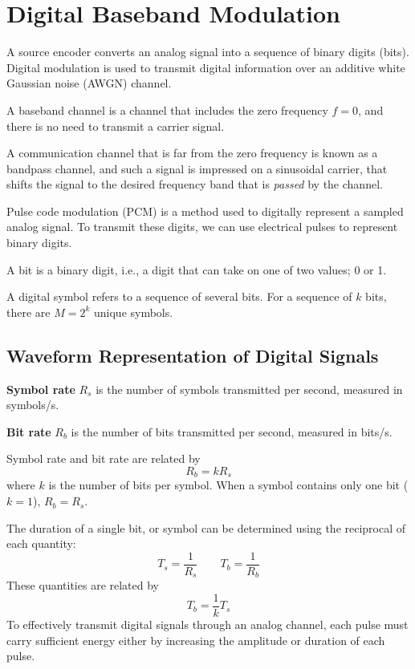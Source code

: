 \documentclass{article}
\begin{document}
\section{Digital Baseband Modulation}
A source encoder converts an analog signal into a sequence of binary
digits (bits). Digital modulation is used to transmit digital
information over an additive white Gaussian noise (AWGN) channel.
\begin{definition}
    A baseband channel is a channel that includes the zero frequency
    \(f = 0\), and there is no need to transmit a carrier signal.
\end{definition}
\begin{definition}
    A communication channel that is far from the zero frequency is
    known as a bandpass channel, and such a signal is impressed on a
    sinusoidal carrier, that shifts the signal to the desired frequency
    band that is \textit{passed} by the channel.
\end{definition}
Pulse code modulation (PCM) is a method used to digitally represent a
sampled analog signal. To transmit these digits, we can use electrical
pulses to represent binary digits.
\begin{definition}[Bit]
    A bit is a binary digit, i.e., a digit that can take on one of two
    values; 0 or 1.
\end{definition}
\begin{definition}
    A digital symbol refers to a sequence of several bits.
    For a sequence of \(k\) bits, there are \(M = 2^k\) unique symbols.
\end{definition}
\subsection{Waveform Representation of Digital Signals}
\textbf{Symbol rate} \(R_s\) is the number of symbols transmitted
per second, measured in \unit{symbols/s}.

\textbf{Bit rate} \(R_b\) is the number of bits transmitted
per second, measured in \unit{bits/s}.

Symbol rate and bit rate are related by
\begin{equation*}
    R_b = k R_s
\end{equation*}
where \(k\) is the number of bits per symbol. When a symbol contains
only one bit (\(k = 1\)), \(R_b = R_s\).

The duration of a single bit, or symbol can be determined using the
reciprocal of each quantity:
\begin{equation*}
    T_s = \frac{1}{R_s} \qquad T_b = \frac{1}{R_b}
\end{equation*}
These quantities are related by
\begin{equation*}
    T_b = \frac{1}{k} T_s
\end{equation*}
To effectively transmit digital signals through an analog channel, each
pulse must carry sufficient energy either by increasing the amplitude
or duration of each pulse.
\end{document}
